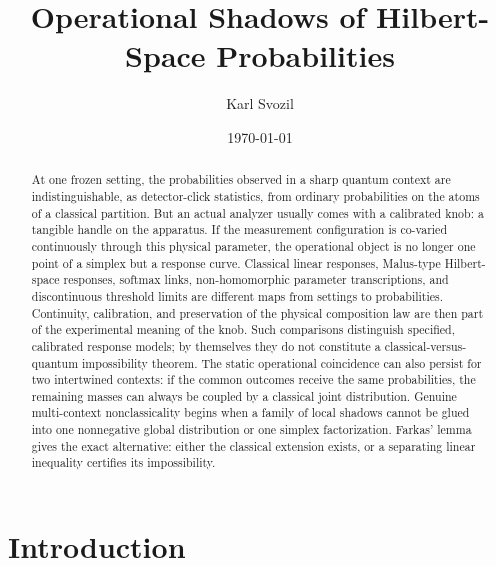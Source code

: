 \documentclass[aps,pra,reprint,superscriptaddress,nofootinbib,floatfix]{revtex4-2}
\begin{document}
\title{Operational Shadows of Hilbert-Space Probabilities}

\author{Karl Svozil}

\date{\today}

\begin{abstract}
At one frozen setting, the probabilities observed in a sharp quantum context are indistinguishable, as detector-click statistics, from ordinary probabilities on the atoms of a classical partition. But an actual analyzer usually comes with a calibrated knob: a tangible handle on the apparatus. If the measurement configuration is co-varied continuously through this physical parameter, the operational object is no longer one point of a simplex but a response curve. Classical linear responses, Malus-type Hilbert-space responses, softmax links, non-homomorphic parameter transcriptions, and discontinuous threshold limits are different maps from settings to probabilities. Continuity, calibration, and preservation of the physical composition law are then part of the experimental meaning of the knob. Such comparisons distinguish specified, calibrated response models; by themselves they do not constitute a classical-versus-quantum impossibility theorem. The static operational coincidence can also persist for two intertwined contexts: if the common outcomes receive the same probabilities, the remaining masses can always be coupled by a classical joint distribution. Genuine multi-context nonclassicality begins when a family of local shadows cannot be glued into one nonnegative global distribution or one simplex factorization. Farkas' lemma gives the exact alternative: either the classical extension exists, or a separating linear inequality certifies its impossibility.
\end{abstract}

\maketitle

\section{Introduction}
\end{document}
